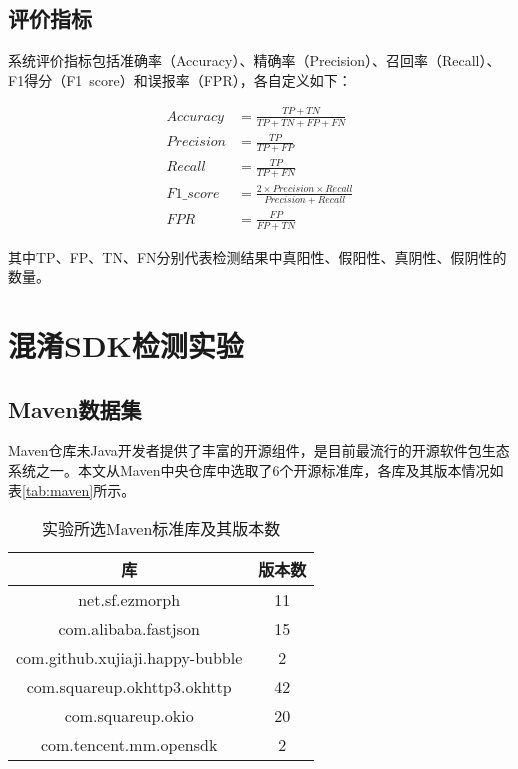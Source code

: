 \subsection{评价指标}
系统评价指标包括准确率（Accuracy）、精确率（Precision）、召回率（Recall）、F1得分（F1\ score）和误报率（FPR），各自定义如下：

\begin{subequations}
\begin{align}
Accuracy&=\frac{TP+TN}{TP+TN+FP+FN}\\
Precision&=\frac{TP}{TP+FP}\\
Recall&=\frac{TP}{TP+FN}\\
F1\_score&=\frac{2\times Precision\times Recall}{Precision+Recall}\\
FPR&=\frac{FP}{FP+TN}
\end{align}
\end{subequations}

其中TP、FP、TN、FN分别代表检测结果中真阳性、假阳性、真阴性、假阴性的数量。


\section{混淆SDK检测实验}

\subsection{Maven数据集}
Maven仓库未Java开发者提供了丰富的开源组件，是目前最流行的开源软件包生态系统之一。本文从Maven中央仓库中选取了6个开源标准库，各库及其版本情况如表\ref{tab:maven}所示。

\begin{table}[!hpt]
  \caption{实验所选Maven标准库及其版本数}
  \label{tab:config}
  \centering
  \begin{tabular}{cc} \toprule
    库 &  版本数 \\ \midrule
	net.sf.ezmorph & 11\\
	com.alibaba.fastjson & 15\\
	com.github.xujiaji.happy-bubble & 2\\
	com.squareup.okhttp3.okhttp & 42\\
	com.squareup.okio & 20\\
	com.tencent.mm.opensdk & 2\\
	 \bottomrule

  \end{tabular}
\end{table}

